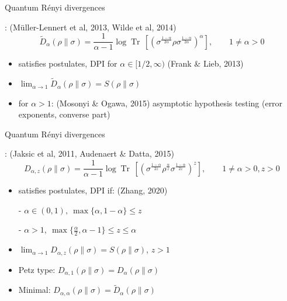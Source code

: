 \documentclass[mathserif]{beamer}
\newcommand{\<}{\langle}
\renewcommand{\>}{\rangle}
\newcommand{\Tr}{\operatorname{Tr}\,}
\begin{document}
\begin{frame}{Quantum R\'enyi divergences}

: {\small (M\"uller-Lennert et al,
2013, Wilde et al, 2014)} 
\[
\tilde
D_\alpha(\rho\|\sigma)=\frac1{\alpha-1}\log\Tr\left[\left(\sigma^{\frac{1-\alpha}{2\alpha}}\rho\sigma^{\frac{1-\alpha}{2\alpha}}\right)^\alpha\right],\qquad
1\ne \alpha>0
\]
\begin{itemize}
\item satisfies postulates, DPI for $\alpha\in [1/2,\infty)$ {\small (Frank \& Lieb,
2013)}

\vskip 3mm
\item $\lim_{\alpha\to 1} \tilde D_\alpha(\rho\|\sigma)=S(\rho\|\sigma)$
\vskip 3mm
\item {} for $\alpha>1$: {\small (Mosonyi \& Ogawa,
2015)}
\vskip 2mm
asymptotic hypothesis testing (error
exponents, converse part) 

\end{itemize}

\end{frame}


\begin{frame}{Quantum R\'enyi divergences}

: {\small (Jaksic et al, 2011, Audenaert \&
Datta, 2015)}
\[
D_{\alpha,z}(\rho\|\sigma)
=\frac1{\alpha-1}\log\Tr\left[\left(\sigma^{\frac{1-\alpha}{2z}}\rho^{\frac{\alpha}{z}}\sigma^{\frac{1-\alpha}{2z}}\right)^z
\right],\qquad 1\ne \alpha>0, z>0
\]
\begin{itemize}
\item satisfies postulates, DPI if: {\small (Zhang, 2020)}

\medskip
\qquad - $\alpha\in (0,1),\ \max\{\alpha,1-\alpha\}\le z$

\medskip 
\qquad - $\alpha>1,\
\max\{\frac{\alpha}2,\alpha-1\}\le z\le \alpha$
\vskip 3mm
\item $\lim_{\alpha\to 1} D_{\alpha,z}(\rho\|\sigma)=S(\rho\|\sigma)$, $z>1$
\vskip 3mm
\item Petz type: $D_{\alpha,1}(\rho\|\sigma)=D_\alpha(\rho\|\sigma)$
\vskip 3mm
\item Minimal: $D_{\alpha,\alpha}(\rho\|\sigma)=\tilde D_\alpha(\rho\|\sigma)$
\end{itemize}



\end{frame}
\end{document}
